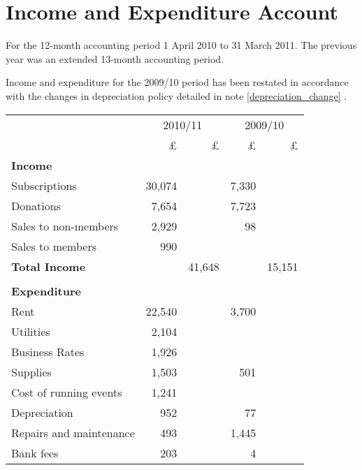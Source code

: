 \section{Income and Expenditure Account}
For the 12-month accounting period 1 April 2010 to 31 March 2011.
The previous year was an extended 13-month accounting period.

Income and expenditure for the 2009/10 period has been restated in accordance
with the changes in depreciation policy detailed in note \ref{depreciation_change} .

\begin{center}
\begin{tabular}{ l  r  r r r }
\toprule
            & \multicolumn{2}{c}{2010/11}  & \multicolumn{2}{c}{2009/10} \\
\cmidrule(r){2-3} \cmidrule(r){4-5}
                            & £      & £      & £     & £     \\
{\bf Income}                &        &        &       &       \\
Subscriptions               & 30,074 &        & 7,330 &       \\
Donations                   & 7,654  &        & 7,723 &       \\
Sales to non-members        & 2,929  &        & 98    &       \\
Sales to members            & 990    &        &       &       \\
{\bf Total Income}          &        & 41,648 &       & 15,151 \\
\cmidrule(r){2-3} \cmidrule(r){4-5} \\
{\bf Expenditure}           &        &        &       &         \\
Rent                        & 22,540 &        & 3,700 &         \\
Utilities                   & 2,104  &        &       &   \\
Business Rates              & 1,926  &        &       &   \\
Supplies                    & 1,503  &        & 501   &   \\
Cost of running events      & 1,241  &        &       &   \\
Depreciation                & 952    &        & 77    &   \\
Repairs and maintenance     & 493    &        & 1,445 &         \\
Bank fees                   & 203    &        & 4     &   \\

\end{tabular}
\end{center}
